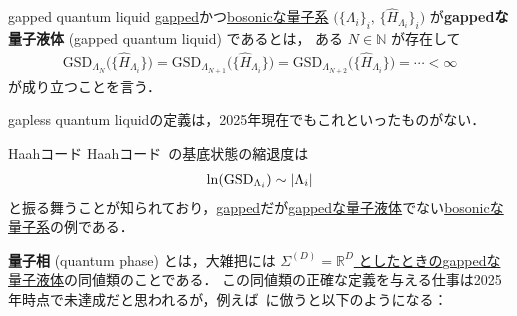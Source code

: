 \documentclass[TQFT_main]{subfiles}
\begin{document}
\begin{mydefph}[label=def:gappedQL]{gapped quantum liquid}
    \hyperref[def:gapped]{gapped}かつ\hyperref[def:bosonic-lattice-model]{bosonicな量子系} $\bigl( \{\Lambda_i\}_i,\, \{\hat{H}_{\Lambda_i}\}_i \bigr)$ が\textbf{gappedな量子液体} (gapped quantum liquid) であるとは，
    ある $N \in \mathbb{N}$ が存在して
    \begin{align}
        \mathrm{GSD}_{\Lambda_{N}}\bigl( \{\hat{H}_{\Lambda_i}\} \bigr) = \mathrm{GSD}_{\Lambda_{N+1}}\bigl( \{\hat{H}_{\Lambda_i}\} \bigr) = \mathrm{GSD}_{\Lambda_{N+2}}\bigl( \{\hat{H}_{\Lambda_i}\} \bigr) = \cdots < \infty
    \end{align}
    が成り立つことを言う．
\end{mydefph}

\begin{marker}
    gapless quantum liquidの定義は，2025年現在でもこれといったものがない．
\end{marker}

\begin{myexample}[label=ex:Haah]{Haahコード}
    Haahコード~\cite{Haah2011}の基底状態の縮退度は
    \begin{align}
        \ln(\mathrm{GSD}_{\Lambda_i}) \sim \abs{\Lambda_i}
    \end{align}
    と振る舞うことが知られており，\hyperref[def:gapped]{gapped}だが\hyperref[def:gappedQL]{gappedな量子液体}でない\hyperref[def:bosonic-lattice-model]{bosonicな量子系}の例である．
\end{myexample}


\textbf{量子相} (quantum phase) とは，大雑把には \underline{$\Sigma^{(D)} = \mathbb{R}^{D}$ としたときの}\hyperref[def:gappedQL]{gappedな量子液体}の同値類のことである．
この同値類の正確な定義を与える仕事は2025年時点で未達成だと思われるが，例えば~\cite[p.3]{ChenGuWen2010}に倣うと以下のようになる：
\end{document}
